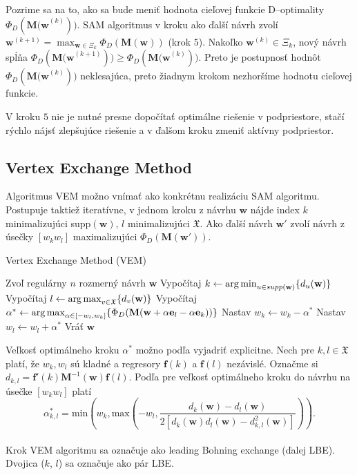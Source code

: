 Pozrime sa na to, ako sa bude meniť hodnota cieľovej funkcie D--optimality $\Phi_D(\mathbf{M(w}^{(k)}))$. SAM algoritmus v kroku ako ďalší návrh zvolí $\mathbf w^{(k+1)} = \max_{\mathbf w \in \Xi_k} \Phi_D(\mathbf{M(w)})$ (krok $5$).
Nakoľko $\mathbf w^{(k)} \in \Xi_k$, nový návrh spĺňa $\Phi_D(\mathbf {M(w}^{(k+1)})) \geq \Phi_D(\mathbf{M(w}^{(k)}))$. Preto je postupnosť hodnôt $\Phi_D(\mathbf{M(w}^{(k)}))$ neklesajúca, preto žiadnym krokom nezhoršíme hodnotu cieľovej funkcie.

V kroku $5$ nie je nutné presne dopočítať optimálne riešenie v podpriestore, stačí rýchlo nájsť zlepšujúce riešenie a v ďalšom kroku zmeniť aktívny podpriestor.

\subsection{Vertex Exchange Method}

Algoritmus VEM možno vnímať ako konkrétnu realizáciu SAM algoritmu. Postupuje taktiež iteratívne, v jednom kroku z návrhu $\mathbf w$ nájde index $k$ minimalizujúci supp$(\mathbf w)$, $l$ minimalizujúci $\mathfrak X$. Ako ďalší návrh $\mathbf {w'}$ zvolí návrh z úsečky $[w_kw_l]$ maximalizujúci $\Phi_D(\mathbf {M(w')})$.

\begin{algorithm}[H]
	\caption{Vertex Exchange Method (VEM) \cite{rex_harman}}
	\label{vem}
	\begin{algorithmic}[1]
		\State Zvoľ regulárny $n$ rozmerný návrh $\mathbf w$
			\State Vypočítaj $k \leftarrow \operatorname*{arg\,min}_{u \in supp(\mathbf w)} \{ d_u(\mathbf w)\}$
			\State Vypočítaj $l \leftarrow \operatorname*{arg\,max}_{v \in \mathfrak X} \{ d_v(\mathbf w)\}$
			\State Vypočítaj $\alpha^* \leftarrow \operatorname*{arg\,max}_{\alpha \in [-w_l, w_k]} \{ \Phi_D (\mathbf M(\mathbf w+\alpha \mathbf e_l -\alpha \mathbf e_k))\}$
			\State Nastav $w_k \leftarrow w_k - \alpha^*$
			\State Nastav $w_l \leftarrow w_l + \alpha^*$
		\EndWhile
		\State Vráť $\mathbf w$
	\end{algorithmic}
\end{algorithm}

Veľkosť optimálneho kroku $\alpha^*$  možno podľa \cite{rex_harman} vyjadriť explicitne. Nech pre $k, l \in \mathfrak X$ platí, že $w_k, w_l$ sú kladné a regresory $\mathbf f(k)$ a $\mathbf f(l)$ nezávislé. Označme si $d_{k,l}=\mathbf {f'}(k) \mathbf M^{-1}\mathbf{(w)f}(l)$. Podľa \cite{rex_harman} pre veľkosť optimálneho kroku do návrhu na úsečke $[w_kw_l]$ platí $$\alpha_{k,l}^*=\text{min} \left( w_k, \text{max} \left(-w_l, \frac{d_k(\mathbf w)-d_l(\mathbf w)}{2[d_k(\mathbf w)d_l(\mathbf w)-d_{k,l}^2(\mathbf w)]} \right) \right).$$\\

Krok VEM algoritmu sa označuje ako leading Bohning exchange (ďalej LBE). Dvojica ($k$, $l$) sa označuje ako pár LBE.
